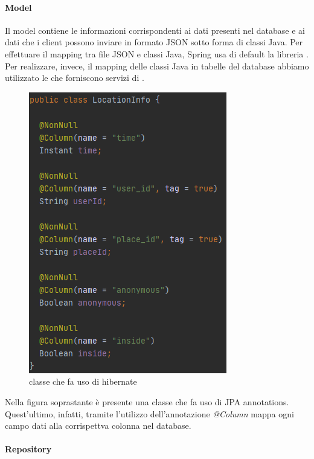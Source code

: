 \documentclass[../manuale-sviluppatore.tex]{subfiles}
\begin{document}
\paragraph{Model}%
\label{par:model}

Il model contiene le informazioni corrispondenti ai dati presenti nel database e ai dati che i client possono inviare in formato JSON sotto forma di classi Java.
Per effettuare il mapping tra file JSON e classi Java, Spring usa di default la libreria .
Per realizzare, invece, il mapping delle classi Java in tabelle del database abbiamo utilizzato le  che forniscono servizi di .

\begin{figure}[H]
  \centering
  \includegraphics{img/server-hibernate-example.png}
  \caption{classe che fa uso di hibernate}%
   \label{fig:classe che fa uso di hibernate}
\end{figure}

Nella figura soprastante è presente una classe che fa uso di JPA annotations.
Quest'ultimo, infatti, tramite l'utilizzo dell'annotazione \textit{@Column} mappa ogni campo dati alla corrispettva colonna nel database.


\paragraph{Repository}%
\label{par:repository}
\end{document}
